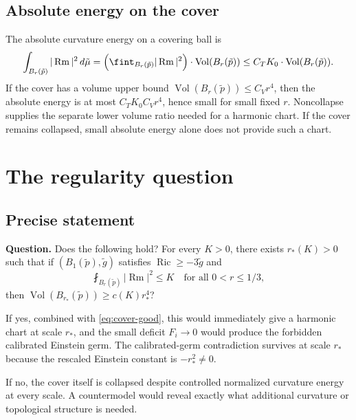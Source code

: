 \subsection{Absolute energy on the cover}
The absolute curvature energy on a covering ball is
\[
\int_{B_r(\tilde p)} |\operatorname{Rm}|^2\,d\tilde\mu
= \Bigl(\fint_{B_r(\tilde p)} |\operatorname{Rm}|^2\Bigr)
\cdot \operatorname{Vol}(B_r(\tilde p))
\le C_T K_0 \cdot \operatorname{Vol}(B_r(\tilde p)).
\]
If the cover has a volume upper bound $\operatorname{Vol}(B_r(\tilde p))\le C_Vr^4$,
then the absolute energy is at most $C_TK_0C_Vr^4$, hence small for small fixed
$r$.  Noncollapse supplies the separate lower volume ratio needed for a
harmonic chart.  If the cover remains collapsed, small absolute energy alone
does not provide such a chart.

\section{The regularity question}

\subsection{Precise statement}
\textbf{Question.} Does the following hold?
For every $K > 0$, there exists $r_*(K) > 0$ such that if $(B_1(\tilde p), \tilde g)$
satisfies $\operatorname{Ric} \ge -3\tilde g$ and
\[
\fint_{B_r(\tilde p)} |\operatorname{Rm}|^2 \le K
\quad\text{for all } 0 < r \le 1/3,
\]
then $\operatorname{Vol}(B_{r_*}(\tilde p)) \ge c(K) r_*^4$?

If yes, combined with \eqref{eq:cover-good}, this would immediately
give a harmonic chart at scale $r_*$, and the small deficit
$F_i \to 0$ would produce the forbidden calibrated Einstein germ.
The calibrated-germ contradiction survives at scale $r_*$ because
the rescaled Einstein constant is $-r_*^2 \ne 0$.

If no, the cover itself is collapsed despite controlled normalized
curvature energy at every scale. A countermodel would reveal
exactly what additional curvature or topological structure is needed.

